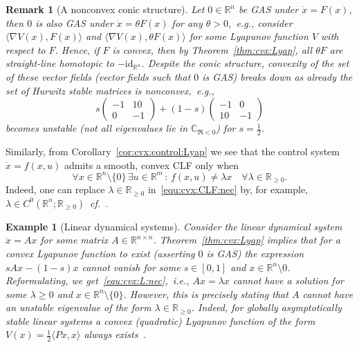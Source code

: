 \documentclass[letterpaper, 10 pt, conference]{ieeeconf}  %
\theoremstyle{mystyle}
\newtheorem{example}[theorem]{Example}
\newtheorem{remark}[theorem]{Remark}
\begin{document}
\begin{remark}[A nonconvex conic structure]
    Let $0\in \mathbb{R}^n$ be GAS under $\dot{x}=F(x)$, then $0$ is also GAS under $\dot{x}=\theta F(x)$ for any $\theta>0$,~\textit{e.g.}, consider $\langle \nabla V(x), F(x)\rangle $ and $\langle \nabla V(x), \theta F(x)\rangle$ for some Lyapunov function $V$ with respect to $F$. Hence, {if $F$ is convex}, then by Theorem~\ref{thm:cvx:Lyap}, all $\theta F$ are straight-line homotopic to $-\mathrm{id}_{\mathbb{R}^n}$. {Despite the conic structure, convexity of the set of these vector fields (vector fields such that $0$ is GAS)} breaks down as already the set of Hurwitz stable matrices is nonconvex,~\textit{e.g.}, 
    \begin{equation*}
        s\begin{pmatrix}
            -1 & 10\\ 0 & -1
        \end{pmatrix} + (1-s)\begin{pmatrix}
            -1 & 0\\ 10 & -1
        \end{pmatrix}
    \end{equation*}
    becomes unstable (not all eigenvalues lie in $\mathbb{C}_{\Re<0}$) for $s=\tfrac{1}{2}$. 
\end{remark}

Similarly, from Corollary~\ref{cor:cvx:control:Lyap} we see that the control system $\dot{x}=f(x,u)$ admits a smooth, convex CLF only when
\begin{equation}
    \label{equ:cvx:CLF:nec}
    \forall x\in \mathbb{R}^n\setminus \{0\}\,\exists u \in \mathbb{R}^m\,:\,  f(x,u)\neq \lambda x \quad \forall \lambda\in \mathbb{R}_{\geq 0}.  
\end{equation}
Indeed, one can replace $\lambda\in \mathbb{R}_{\geq 0}$ in~\eqref{equ:cvx:CLF:nec} by, for example, $\lambda\in C^{0}(\mathbb{R}^n;\mathbb{R}_{\geq 0})$~\textit{cf.}~\cite{ref:sepulchre1996homogeneous}. 

\begin{example}[Linear dynamical systems]
\label{ex:lin:sys}
    Consider the linear dynamical system $\dot{x}=Ax$ for some matrix $A\in \mathbb{R}^{n\times n}$. Theorem~\ref{thm:cvx:Lyap} implies that for a convex Lyapunov function to exist (asserting $0$ is GAS) the expression $sAx-(1-s)x$ cannot vanish for some $s\in[0,1]$ and $x\in \mathbb{R}^n\setminus 0$. Reformulating, we get~\eqref{equ:cvx:L:nec},~\textit{i.e.}, $Ax=\lambda x$ cannot have a solution for some $\lambda\geq 0$ and $x\in \mathbb{R}^n\setminus \{0\}$. However, this is precisely stating that $A$ cannot have an unstable eigenvalue of the form $\lambda\in \mathbb{R}_{\geq 0}$. Indeed, for globally asymptotically stable linear systems a convex (quadratic) Lyapunov function of the form $V(x)=\tfrac{1}{2}\langle Px, x \rangle$ always exists~\cite[Thm.~18]{ref:sontag2013mathematical}.  
\end{example}
\end{document}
